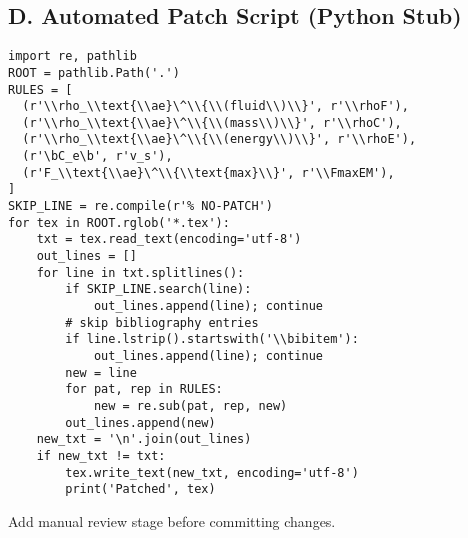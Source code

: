 \documentclass[11pt]{article}
\newcommand{\rhoF}{\rho_{\!f}}                           %
\newcommand{\rhoE}{\rho_{\!E}}                           %
\newcommand{\rhoC}{\rho_{\mathrm{core}}} %
\newcommand{\FmaxEM}{F_{\mathrm{EM}}^{\max}}             %
\begin{document}
\subsection*{D. Automated Patch Script (Python Stub)}
\begin{verbatim}
import re, pathlib
ROOT = pathlib.Path('.')
RULES = [
  (r'\\rho_\\text{\\ae}\^\\{\\(fluid\\)\\}', r'\\rhoF'),
  (r'\\rho_\\text{\\ae}\^\\{\\(mass\\)\\}', r'\\rhoC'),
  (r'\\rho_\\text{\\ae}\^\\{\\(energy\\)\\}', r'\\rhoE'),
  (r'\bC_e\b', r'v_s'),
  (r'F_\\text{\\ae}\^\\{\\text{max}\\}', r'\\FmaxEM'),
]
SKIP_LINE = re.compile(r'% NO-PATCH')
for tex in ROOT.rglob('*.tex'):
    txt = tex.read_text(encoding='utf-8')
    out_lines = []
    for line in txt.splitlines():
        if SKIP_LINE.search(line):
            out_lines.append(line); continue
        # skip bibliography entries
        if line.lstrip().startswith('\\bibitem'):
            out_lines.append(line); continue
        new = line
        for pat, rep in RULES:
            new = re.sub(pat, rep, new)
        out_lines.append(new)
    new_txt = '\n'.join(out_lines)
    if new_txt != txt:
        tex.write_text(new_txt, encoding='utf-8')
        print('Patched', tex)
\end{verbatim}
Add manual review stage before committing changes.
\end{document}
